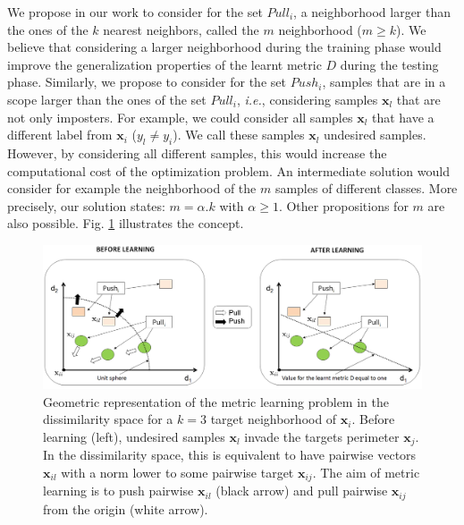 We propose in our work to consider for the set $Pull_i$, a neighborhood larger than the ones of the $k$ nearest neighbors, called the $m$ neighborhood ($m \geq k$). We believe that considering a larger neighborhood during the training phase would improve the generalization properties of the learnt metric $D$ during the testing phase. Similarly, we propose to consider for the set $Push_i$, samples that are in a scope larger than the ones of the set $Pull_i$, \textit{i.e.}, considering samples $\textbf{x}_l$ that are not only imposters. For example, we could consider all samples $\textbf{x}_l$ that have a different label from $\textbf{x}_i$ ($y_l \neq y_i$). We call these samples $\textbf{x}_l$ undesired samples. However, by considering all different samples, this would increase the computational cost of the optimization problem. An intermediate solution would consider for example the neighborhood of the $m$ samples of different classes. More precisely, our solution states: $m=\alpha.k$ with $\alpha \geq 1$. Other propositions for $m$ are also possible. Fig. \ref{fig:Transposition_Pairwise2} illustrates the concept.



\begin{figure}[t]
	\centering
	\includegraphics[width=0.9\linewidth]{images/Transposition_Pairwise3}
	\caption{Geometric representation of the metric learning problem in the dissimilarity space for a $k=3$ target neighborhood of $\textbf{x}_i$. Before learning (left), undesired samples $\textbf{x}_l$ invade the targets perimeter $\textbf{x}_j$. In the dissimilarity space, this is equivalent to have pairwise vectors $\textbf{x}_{il}$ with a norm lower to some pairwise target $\textbf{x}_{ij}$. The aim of metric learning is to push pairwise $\textbf{x}_{il}$ (black arrow) and pull pairwise $\textbf{x}_{ij}$ from the origin (white arrow).}
	\label{fig:Transposition_Pairwise2}
\end{figure}


